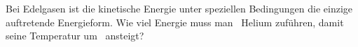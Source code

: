 Bei Edelgasen ist die kinetische Energie unter speziellen Bedingungen die einzige auftretende Energieform. Wie viel Energie muss man \mHeO\ Helium zuführen, damit seine Temperatur um \dThO\ ansteigt?
